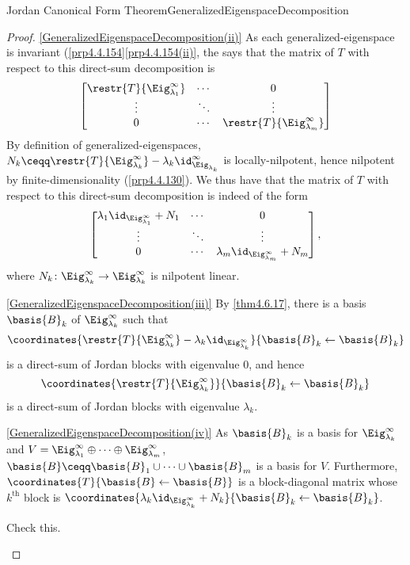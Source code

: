 \begin{thm}{Jordan Canonical Form Theorem}{GeneralizedEigenspaceDecomposition}
\begin{proof}
		\blni
		\cref{GeneralizedEigenspaceDecomposition(ii)} As each generalized-eigenspace is invariant (\cref{prp4.4.154}\cref{prp4.4.154(ii)}, the  says that the matrix of $T$ with respect to this direct-sum decomposition is
		\begin{equation}
			\begin{bmatrix}\restr{T}{\Eig _{\lambda _1}^{\infty}} & \cdots & 0 \\ \vdots & \ddots & \vdots \\ 0 & \cdots & \restr{T}{\Eig _{\lambda _m}^{\infty}}\end{bmatrix}
		\end{equation}
		By definition of generalized-eigenspaces, $N_k\ceqq \restr{T}{\Eig _{\lambda _k}^{\infty}}-\lambda _k\id _{\Eig _{\lambda _k}}^{\infty}$ is locally-nilpotent, hence nilpotent by finite-dimensionality (\cref{prp4.4.130}).  We thus have that the matrix of $T$ with respect to this direct-sum decomposition is indeed of the form
		\begin{equation}
			\begin{bmatrix}\lambda _1\id _{\Eig _{\lambda _1}^{\infty}}+N_1 & \cdots & 0 \\ \vdots & \ddots & \vdots \\ 0 & \cdots & \lambda _m\id _{\Eig _{\lambda _m}^{\infty}}+N_m\end{bmatrix},
		\end{equation}
		where $N_k\colon \Eig _{\lambda _k}^{\infty}\rightarrow \Eig _{\lambda _k}^{\infty}$ is nilpotent linear.
		
		\blni
		\cref{GeneralizedEigenspaceDecomposition(iii)} By \cref{thm4.6.17}, there is a basis $\basis{B}_k$ of $\Eig _{\lambda _k}^{\infty}$ such that
		\begin{equation}
			\coordinates{\restr{T}{\Eig _{\lambda _k}^{\infty}}-\lambda _k\id _{\Eig _{\lambda _k}^{\infty}}}{\basis{B}_k\leftarrow \basis{B}_k}
		\end{equation}
		is a direct-sum of Jordan blocks with eigenvalue $0$, and hence
		\begin{equation}
			\coordinates{\restr{T}{\Eig _{\lambda _k}^{\infty}}}{\basis{B}_k\leftarrow \basis{B}_k}
		\end{equation}
		is a direct-sum of Jordan blocks with eigenvalue $\lambda _k$.
		
		\blni
		\cref{GeneralizedEigenspaceDecomposition(iv)} As $\basis{B}_k$ is a basis for $\Eig _{\lambda _k}^{\infty}$ and $V=\Eig _{\lambda _1}^{\infty}\oplus \cdots \oplus \Eig _{\lambda _m}^{\infty}$, $\basis{B}\ceqq \basis{B}_1\cup \cdots \cup \basis{B}_m$ is a basis for $V$.  Furthermore, $\coordinates{T}{\basis{B}\leftarrow \basis{B}}$ is a block-diagonal matrix whose $k^{\text{th}}$ block is $\coordinates{\lambda _k\id _{\Eig _{\lambda _k}^{\infty}}+N_k}{\basis{B}_k\leftarrow \basis{B}_k}$.
		\begin{exr}[breakable=false]{}{}
			Check this.
		\end{exr}
		

\end{proof}
\end{thm}
